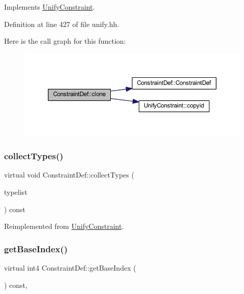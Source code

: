 Implements \mbox{\hyperlink{class_unify_constraint_a4f068343932637d355644bb21559aa12}{Unify\+Constraint}}.



Definition at line 427 of file unify.\+hh.

Here is the call graph for this function\+:
\nopagebreak
\begin{figure}[H]
\begin{center}
\leavevmode
\includegraphics[width=350pt]{class_constraint_def_aae85758fdf38d79bdd086955afa57cde_cgraph}
\end{center}
\end{figure}
\mbox{\label{class_constraint_def_aa0899ad894f7c0676371ef9a25effc55}} 
\subsubsection{\texorpdfstring{collectTypes()}{collectTypes()}}
{\footnotesize\ttfamily virtual void Constraint\+Def\+::collect\+Types (\begin{DoxyParamCaption}\item[{vector$<$ \mbox{\hyperlink{class_unify_datatype}{Unify\+Datatype}} $>$ \&}]{typelist }\end{DoxyParamCaption}) const\hspace{0.3cm}{\ttfamily [virtual]}}



Reimplemented from \mbox{\hyperlink{class_unify_constraint_acb83b6bea3b21e13054e72ac9cfaba0f}{Unify\+Constraint}}.

\mbox{\label{class_constraint_def_a2b5f27e4f0b872da4ffcfa56af4cbfaa}} 
\subsubsection{\texorpdfstring{getBaseIndex()}{getBaseIndex()}}
{\footnotesize\ttfamily virtual int4 Constraint\+Def\+::get\+Base\+Index (\begin{DoxyParamCaption}\item[{void}]{ }\end{DoxyParamCaption}) const\hspace{0.3cm}{\ttfamily [inline]}, {\ttfamily [virtual]}}



